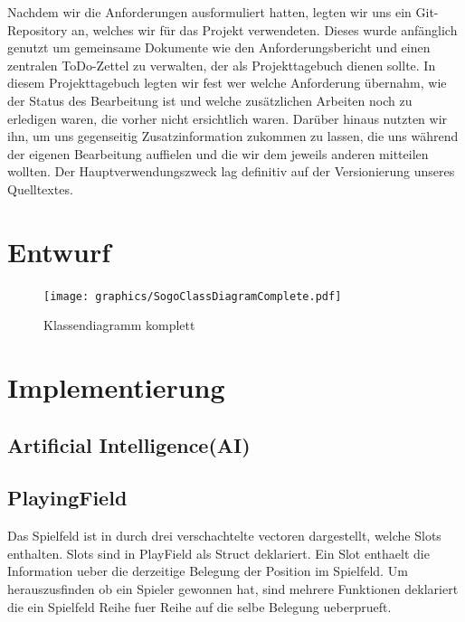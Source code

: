\documentclass[a4paper]{scrartcl}
\begin{document}
Nachdem wir die Anforderungen ausformuliert hatten, legten wir uns ein Git-Repository an, welches wir für das Projekt verwendeten. Dieses wurde anfänglich genutzt um gemeinsame Dokumente wie den Anforderungsbericht und einen zentralen ToDo-Zettel zu verwalten, der als Projekttagebuch dienen sollte. In diesem Projekttagebuch legten wir fest wer welche Anforderung übernahm, wie der Status des Bearbeitung ist und welche zusätzlichen Arbeiten noch zu erledigen waren, die vorher nicht ersichtlich waren. Darüber hinaus nutzten wir ihn, um uns gegenseitig Zusatzinformation zukommen zu lassen, die uns während der eigenen Bearbeitung auffielen und die wir dem jeweils anderen mitteilen wollten. Der Hauptverwendungszweck lag definitiv auf der Versionierung unseres Quelltextes.

\section{Entwurf}\label{ch:Entwurf}

\begin{figure}[H]
 \centering
 \texttt{[image: graphics/SogoClassDiagramComplete.pdf]}
 \caption{Klassendiagramm komplett}
 \label{fig:ClassdiagramComplete}
\end{figure}

\section{Implementierung}\label{ch:Implementierung}


\subsection{Artificial Intelligence(AI)}\label{ch:AI}

\subsection{PlayingField}\label{ch:PlayingField}
Das Spielfeld ist in durch drei verschachtelte vectoren dargestellt, welche Slots enthalten. Slots sind in PlayField als Struct deklariert. Ein Slot enthaelt die Information ueber die derzeitige Belegung der Position im Spielfeld. 
Um herauszusfinden ob ein Spieler gewonnen hat, sind mehrere  Funktionen deklariert die ein Spielfeld Reihe fuer Reihe auf die selbe Belegung ueberprueft.
\end{document}
